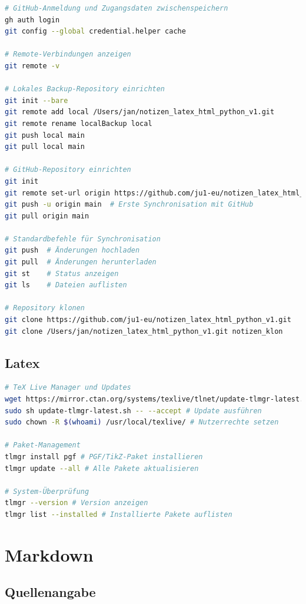 \documentclass{vorlage-design-main}
\begin{document}
\begin{lstlisting}[language=bash]
# GitHub-Anmeldung und Zugangsdaten zwischenspeichern
gh auth login
git config --global credential.helper cache

# Remote-Verbindungen anzeigen
git remote -v

# Lokales Backup-Repository einrichten
git init --bare
git remote add local /Users/jan/notizen_latex_html_python_v1.git
git remote rename localBackup local
git push local main
git pull local main

# GitHub-Repository einrichten
git init
git remote set-url origin https://github.com/ju1-eu/notizen_latex_html_python_v1.git
git push -u origin main  # Erste Synchronisation mit GitHub
git pull origin main

# Standardbefehle für Synchronisation
git push  # Änderungen hochladen
git pull  # Änderungen herunterladen
git st    # Status anzeigen
git ls    # Dateien auflisten

# Repository klonen
git clone https://github.com/ju1-eu/notizen_latex_html_python_v1.git
git clone /Users/jan/notizen_latex_html_python_v1.git notizen_klon
\end{lstlisting}

\subsection{Latex}\label{latex}

\begin{lstlisting}[language=bash]
# TeX Live Manager und Updates
wget https://mirror.ctan.org/systems/texlive/tlnet/update-tlmgr-latest.sh # Manager herunterladen
sudo sh update-tlmgr-latest.sh -- --accept # Update ausführen
sudo chown -R $(whoami) /usr/local/texlive/ # Nutzerrechte setzen

# Paket-Management
tlmgr install pgf # PGF/TikZ-Paket installieren
tlmgr update --all # Alle Pakete aktualisieren

# System-Überprüfung
tlmgr --version # Version anzeigen
tlmgr list --installed # Installierte Pakete auflisten
\end{lstlisting}

\section{Markdown}\label{markdown}

\subsection{Quellenangabe}\label{quellenangabe}
\end{document}
